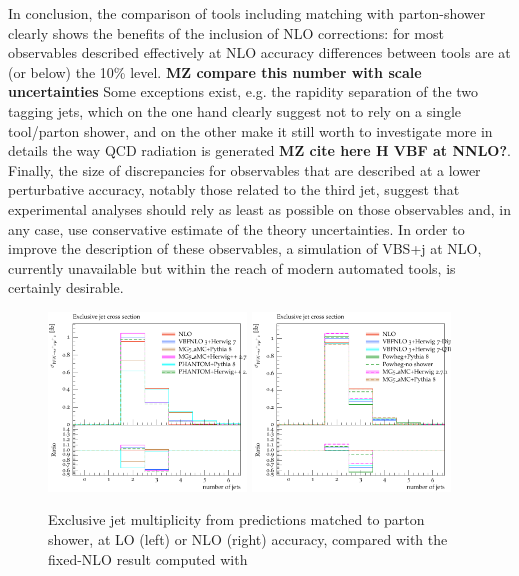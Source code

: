 In conclusion, the comparison of tools including matching with parton-shower clearly shows the benefits of the inclusion of NLO corrections: for most observables described
effectively at NLO accuracy differences between tools are at (or below) the 10\% level. {\bf MZ compare this number with scale uncertainties} 
Some exceptions exist, e.g. the rapidity separation of the two tagging jets, which
on the one hand clearly suggest not to rely on a single tool/parton shower, and on the other make it still worth to investigate more in details the way QCD radiation is 
generated {\bf MZ cite here H VBF at NNLO?}. Finally, the size of discrepancies for observables that are described at a lower perturbative accuracy, notably those related to the third jet, suggest that 
experimental analyses should rely as least as possible on those observables and, in any case, use conservative estimate of the theory uncertainties. In order to improve the
description of these observables, a simulation of VBS+j at NLO, currently unavailable but within the reach of modern automated tools, is certainly desirable.

\begin{figure}[hbt]
\centering
\includegraphics[width=0.47\textwidth]{figures/LOPS/jetsexclusive.pdf}
\includegraphics[width=0.47\textwidth]{figures/NLOPS/jetsexclusive.pdf}
\caption{Exclusive jet multiplicity from predictions matched to parton shower, at LO (left) or NLO (right) accuracy, compared with the fixed-NLO result
    computed with }
\label{fig:PSnjet}
\end{figure}

